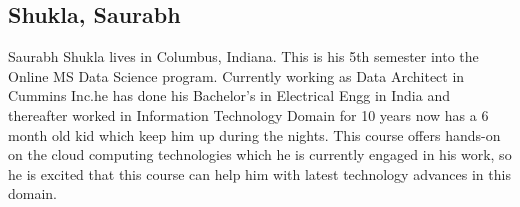 
\subsection{Shukla, Saurabh}

Saurabh Shukla lives in Columbus, Indiana. This is his 5th semester into the Online MS Data Science program.  Currently working as Data Architect in Cummins Inc.he has done his Bachelor's in Electrical Engg in India and thereafter worked in Information Technology Domain for 10 years now has a 6 month old kid which keep him up during the nights.  This course offers hands-on on the cloud computing technologies which he is currently engaged in his work, so he is excited that this course can help him with latest technology advances in this domain.
